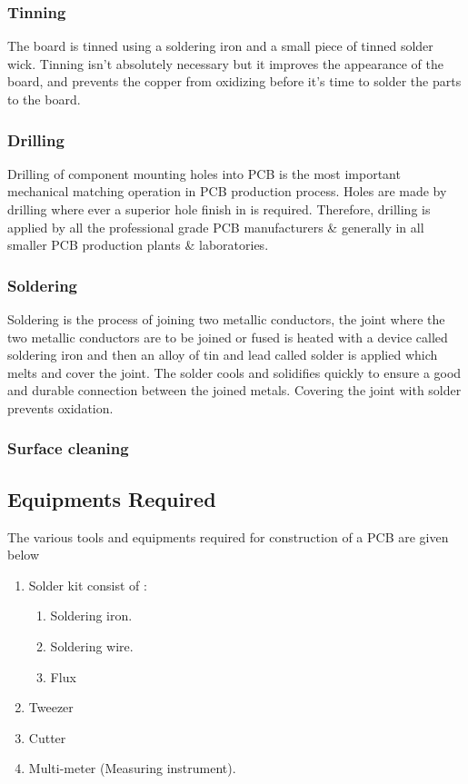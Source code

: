 \documentclass[12pt,a4paper,oneside,openright]{report}
\begin{document}
\subsubsection{Tinning}
The board is tinned using a soldering iron and a small piece of tinned solder wick. Tinning isn't absolutely necessary but it improves the appearance of the board, and prevents the copper from oxidizing before it's time to solder the parts to the board.
\subsubsection{Drilling}
Drilling of component mounting holes into PCB is the most important mechanical matching operation in PCB production process. Holes are made by drilling where ever a superior hole finish in is required. Therefore, drilling is applied by all the professional grade PCB manufacturers \& generally in all smaller PCB production plants \& laboratories.
\subsubsection{Soldering}
Soldering is the process of joining two metallic conductors, the joint where the two metallic conductors are to be joined or fused is heated with a device called soldering iron and then an alloy of tin and lead called solder is applied which melts and cover the joint. The solder cools and solidifies quickly to ensure a good and durable connection between the joined metals. Covering the joint with solder prevents oxidation.
\subsubsection{Surface cleaning}

\subsection{Equipments Required}
The various tools and equipments required for construction of a PCB are given below
\begin{enumerate}
 \item Solder kit consist of :
 \begin{enumerate}
  \item Soldering iron. 
  \item Soldering wire. 
  \item Flux
 \end{enumerate}
\item Tweezer
\item Cutter
\item Multi-meter (Measuring instrument).
\end{enumerate}
\end{document}
